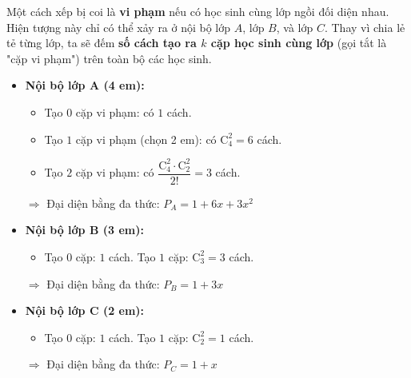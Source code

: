 \begin{ex}
{		Một cách xếp bị coi là \textbf{vi phạm} nếu có học sinh cùng lớp ngồi đối diện nhau. Hiện tượng này chỉ có thể xảy ra ở nội bộ lớp $A$, lớp $B$, và lớp $C$.
		Thay vì chia lẻ tẻ từng lớp, ta sẽ đếm \textbf{số cách tạo ra $k$ cặp học sinh cùng lớp} (gọi tắt là "cặp vi phạm") trên toàn bộ các học sinh.
		\begin{itemize}
			\item \textbf{Nội bộ lớp A (4 em):}
			\begin{itemize}
				\item Tạo $0$ cặp vi phạm: có $1$ cách.
				\item Tạo $1$ cặp vi phạm (chọn 2 em): có $\mathrm{C}_4^2 = 6$ cách.
				\item Tạo $2$ cặp vi phạm: có $\dfrac{\mathrm{C}_4^2 \cdot \mathrm{C}_2^2}{2!} = 3$ cách.
			\end{itemize}
			$\Rightarrow$ Đại diện bằng đa thức: $P_A = 1 + 6x + 3x^2$
			
			\item \textbf{Nội bộ lớp B (3 em):}
			\begin{itemize}
				\item Tạo $0$ cặp: $1$ cách. Tạo $1$ cặp: $\mathrm{C}_3^2 = 3$ cách.
			\end{itemize}
			$\Rightarrow$ Đại diện bằng đa thức: $P_B = 1 + 3x$
			
			\item \textbf{Nội bộ lớp C (2 em):}
			\begin{itemize}
				\item Tạo $0$ cặp: $1$ cách. Tạo $1$ cặp: $\mathrm{C}_2^2 = 1$ cách.
			\end{itemize}
			$\Rightarrow$ Đại diện bằng đa thức: $P_C = 1 + x$
		\end{itemize}
		
}
\end{ex}
